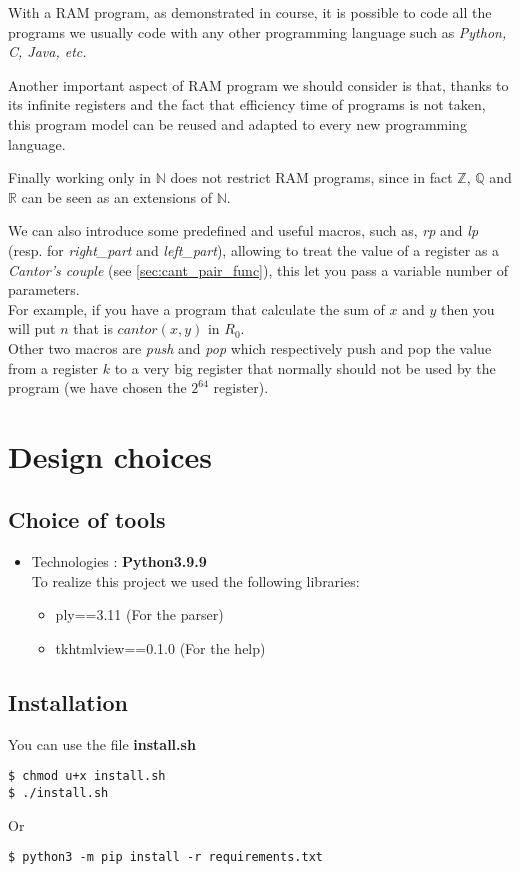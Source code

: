 With a RAM program, as demonstrated in course, it is possible to code all the programs we usually code with any other programming language such as \textit{Python, C, Java, etc.} 

Another important aspect of RAM program we should consider is that, thanks to its infinite registers and the fact that efficiency time of programs is not taken, this program model can be reused and adapted to every new programming language.

Finally working only in $\mathbb{N}$ does not restrict RAM programs, since in fact $\mathbb{Z}$, $\mathbb{Q}$ and  $\mathbb{R}$ can be seen as an extensions of $\mathbb{N}$.

\newpage
We can also introduce some predefined and useful macros, such as, \textit{rp} and \textit{lp} (resp. for \textit{right\_part} and \textit{left\_part}), allowing to treat the value of a register as a \textit{Cantor's couple} (see \ref{sec:cant_pair_func}), this let you pass a variable number of parameters.\\
For example, if you have a program that calculate the sum of $x$ and $y$ then you will put $n$ that is $cantor(x,y)$ in $R_0$.
\\Other two macros are \textit{push} and \textit{pop} which respectively push and pop the value from a register $k$ to a very big register that normally should not be used by the program (we have chosen the $2^{64}$ register).


\section{Design choices}

\subsection{Choice of tools}

\begin{itemize}
\item Technologies : \textbf{Python3.9.9}\\
To realize this project we used the following libraries:
    \begin{itemize}
        \item ply==3.11 (For the parser)
        \item tkhtmlview==0.1.0 (For the help)
    \end{itemize}
\end{itemize}

\subsection{Installation}

You can use the file \textbf{install.sh}

\begin{verbatim}
$ chmod u+x install.sh
$ ./install.sh
\end{verbatim}
Or

\begin{verbatim}
$ python3 -m pip install -r requirements.txt
\end{verbatim}